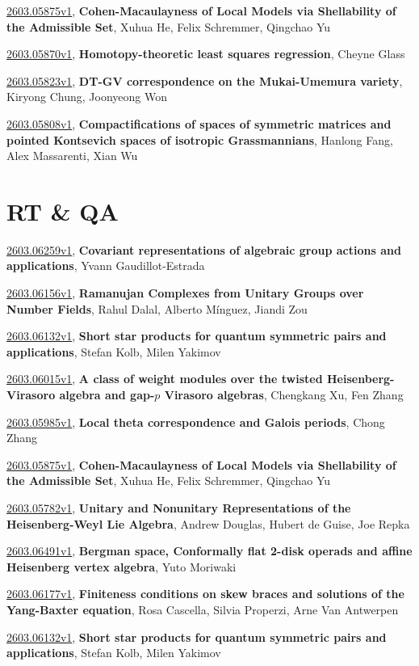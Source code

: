 \documentclass[9pt, a4paper]{article}
\theoremstyle{plain}
\theoremstyle{definition}
\theoremstyle{remark}
\newcommand{\arxiv}[3]{\href{https://arxiv.org/abs/#1}{#1}, \textbf{\textcolor{arxivblue}{#2}}, #3}
\begin{document}
\arxiv{2603.05875v1}{Cohen-Macaulayness of Local Models via Shellability of the Admissible Set}{Xuhua He, Felix Schremmer, Qingchao Yu}

\arxiv{2603.05870v1}{Homotopy-theoretic least squares regression}{Cheyne Glass}

\arxiv{2603.05823v1}{DT-GV correspondence on the Mukai-Umemura variety}{Kiryong Chung, Joonyeong Won}

\arxiv{2603.05808v1}{Compactifications of spaces of symmetric matrices and pointed Kontsevich spaces of isotropic Grassmannians}{Hanlong Fang, Alex Massarenti, Xian Wu}


\section{RT \& QA}
\arxiv{2603.06259v1}{Covariant representations of algebraic group actions and applications}{Yvann Gaudillot-Estrada}

\arxiv{2603.06156v1}{Ramanujan Complexes from Unitary Groups over Number Fields}{Rahul Dalal, Alberto Mínguez, Jiandi Zou}

\arxiv{2603.06132v1}{Short star products for quantum symmetric pairs and applications}{Stefan Kolb, Milen Yakimov}

\arxiv{2603.06015v1}{A class of weight modules over the twisted Heisenberg-Virasoro algebra and gap-$p$ Virasoro algebras}{Chengkang Xu, Fen Zhang}

\arxiv{2603.05985v1}{Local theta correspondence and Galois periods}{Chong Zhang}

\arxiv{2603.05875v1}{Cohen-Macaulayness of Local Models via Shellability of the Admissible Set}{Xuhua He, Felix Schremmer, Qingchao Yu}

\arxiv{2603.05782v1}{Unitary and Nonunitary Representations of the Heisenberg-Weyl Lie Algebra}{Andrew Douglas, Hubert de Guise, Joe Repka}

\arxiv{2603.06491v1}{Bergman space, Conformally flat 2-disk operads and affine Heisenberg vertex algebra}{Yuto Moriwaki}

\arxiv{2603.06177v1}{Finiteness conditions on skew braces and solutions of the Yang-Baxter equation}{Rosa Cascella, Silvia Properzi, Arne Van Antwerpen}

\arxiv{2603.06132v1}{Short star products for quantum symmetric pairs and applications}{Stefan Kolb, Milen Yakimov}

\end{document}
